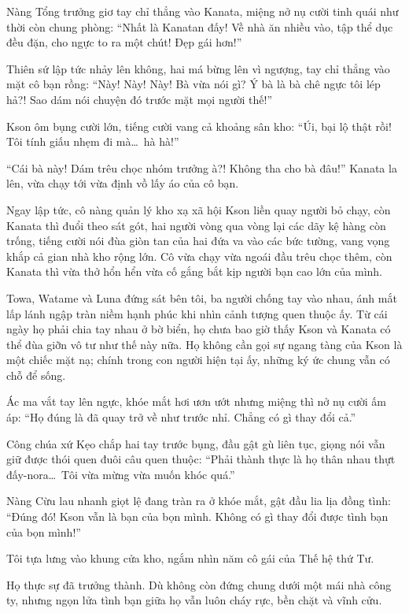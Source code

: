 \documentclass[../main.tex]{subfiles}
\begin{document}
Nàng Tổng trưởng giơ tay chỉ thẳng vào Kanata, miệng nở nụ cười tinh quái như thời còn chung phòng: ``Nhất là Kanatan đấy! Về nhà ăn nhiều vào, tập thể dục đều đặn, cho ngực to ra một chút! Đẹp gái hơn!''

Thiên sứ lập tức nhảy lên không, hai má bừng lên vì ngượng, tay chỉ thẳng vào mặt cô bạn rồng: ``Này! Này! Này! Bà vừa nói gì? Ý bà là bà chê ngực tôi lép hả?! Sao dám nói chuyện đó trước mặt mọi người thế!''

Kson ôm bụng cười lớn, tiếng cười vang cả khoảng sân kho: ``Úi, bại lộ thật rồi! Tôi tính giấu nhẹm đi mà\dots\ hà hà!''

``Cái bà này! Dám trêu chọc nhóm trưởng à?! Không tha cho bà đâu!'' Kanata la lên, vừa chạy tới vừa định vồ lấy áo của cô bạn.

Ngay lập tức, cô nàng quản lý kho xạ xã hội Kson liền quay người bỏ chạy, còn Kanata thì đuổi theo sát gót, hai người vòng qua vòng lại các dãy kệ hàng còn trống, tiếng cười nói đùa giòn tan của hai đứa va vào các bức tường, vang vọng khắp cả gian nhà kho rộng lớn. Cô vừa chạy vừa ngoái đầu trêu chọc thêm, còn Kanata thì vừa thở hổn hển vừa cố gắng bắt kịp người bạn cao lớn của mình.

Towa, Watame và Luna đứng sát bên tôi, ba người chống tay vào nhau, ánh mắt lấp lánh ngập tràn niềm hạnh phúc khi nhìn cảnh tượng quen thuộc ấy. Từ cái ngày họ phải chia tay nhau ở bờ biển, họ chưa bao giờ thấy Kson và Kanata có thể đùa giỡn vô tư như thế này nữa. Họ không cần gọi sự ngang tàng của Kson là một chiếc mặt nạ; chính trong con người hiện tại ấy, những ký ức chung vẫn có chỗ để sống.

Ác ma vắt tay lên ngực, khóe mắt hơi ươn ướt nhưng miệng thì nở nụ cười ấm áp: ``Họ đúng là đã quay trở về như trước nhỉ. Chẳng có gì thay đổi cả.''

Công chúa xứ Kẹo chắp hai tay trước bụng, đầu gật gù liên tục, giọng nói vẫn giữ được thói quen đuôi câu quen thuộc: ``Phải thành thực là họ thân nhau thựt đấy-nora\dots\ Tôi vừa mừng vừa muốn khóc quá.''

Nàng Cừu lau nhanh giọt lệ đang tràn ra ở khóe mắt, gật đầu lia lịa đồng tình: ``Đúng đó! Kson vẫn là bạn của bọn mình. Không có gì thay đổi được tình bạn của bọn mình!''

Tôi tựa lưng vào khung cửa kho, ngắm nhìn năm cô gái của Thế hệ thứ Tư.

Họ thực sự đã trưởng thành. Dù không còn đứng chung dưới một mái nhà công ty, nhưng ngọn lửa tình bạn giữa họ vẫn luôn cháy rực, bền chặt và vĩnh cửu.
\end{document}
